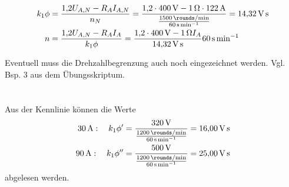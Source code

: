 \documentclass[11pt,a4paper]{scrartcl}
\newcommand{\0}{_{\mybr{0}}}
\newcommand{\1}{_{\mybr{1}}}
\newcommand{\2}{_{\mybr{2}}}
\begin{document}
\subsection{}
\begin{align}
k_1\phi&=\frac{\num{1.2}U_{A,N}-R_A I_{A,N}}{n_N}=\frac{\num{1.2}\cdot\SI{400}{\volt}-\SI{1}{\ohm}\cdot\SI{122}{\ampere}}{\frac{\SI{1500}{\rounds\per\minute}}{\SI{60}{\second\per\minute}}}=\SI{14.32}{\volt\second}\\
n&=\frac{\num{1.2}U_{A,N}-R_A I_A}{k_1\phi}=\frac{\num{1.2}\cdot\SI{400}{\volt}-\SI{1}{\ohm}I_A}{\SI{14.32}{\volt\second}}\SI{60}{\second\per\minute}
\end{align}
\begin{figure*}[!ht]
	\centering
\end{figure*}
Eventuell muss die Drehzahlbegrenzung auch noch eingezeichnet werden. Vgl. Bsp. 3 aus dem Übungsskriptum.

\section{}
Aus der Kennlinie können die Werte
\begin{align}
\SI{30}{\ampere}:\quad k_1\phi'&=\frac{\SI{320}{\volt}}{\frac{\SI{1200}{\rounds\per\minute}}{\SI{60}{\second\per\minute}}}=\SI{16.00}{\volt\second}\\
\SI{90}{\ampere}:\quad k_1\phi''&=\frac{\SI{500}{\volt}}{\frac{\SI{1200}{\rounds\per\minute}}{\SI{60}{\second\per\minute}}}=\SI{25.00}{\volt\second}
\end{align}
abgelesen werden.
\end{document}
